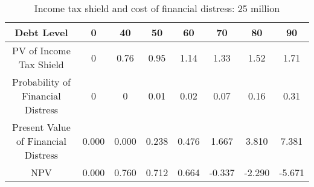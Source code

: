 \begin{table}[ht]
\centering
\begin{tabular}{@{}cccccccc@{}}
\toprule
Debt Level                          & 0     & 40    & 50    & 60    & 70     & 80     & 90     \\ \midrule
PV of Income Tax Shield             & 0     & 0.76  & 0.95  & 1.14  & 1.33   & 1.52   & 1.71   \\
Probability of Financial Distress   & 0     & 0     & 0.01  & 0.02  & 0.07   & 0.16   & 0.31   \\
Present Value of Financial Distress & 0.000 & 0.000 & 0.238 & 0.476 & 1.667  & 3.810  & 7.381  \\
NPV                                 & 0.000 & 0.760 & 0.712 & 0.664 & -0.337 & -2.290 & -5.671 \\ \bottomrule
\end{tabular}
\caption{Income tax shield and cost of financial distress: 25 million}
\label{tab:prob4-25mil}
\end{table}
